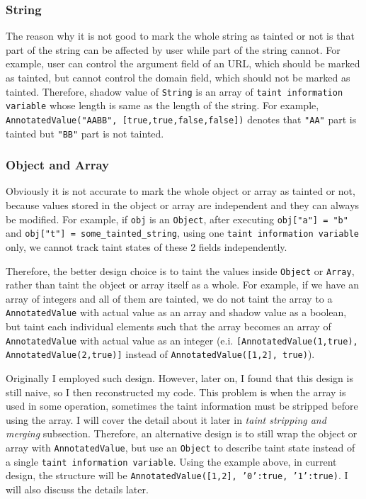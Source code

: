 \subsubsection{String}

The reason why it is not good to mark the whole string as tainted or not is that part of the string can be affected by user while part of the string cannot. For example, user can control the argument field of an URL, which should be marked as tainted, but cannot control the domain field, which should not be marked as tainted. Therefore, shadow value of \texttt{String} is an array of \texttt{taint information variable} whose length is same as the length of the string. For example, \texttt{AnnotatedValue("AABB", [true,true,false,false])} denotes that \texttt{"AA"} part is tainted but \texttt{"BB"} part is not tainted.

\subsubsection{Object and Array}

Obviously it is not accurate to mark the whole object or array as tainted or not, because values stored in the object or array are independent and they can always be modified. For example, if \texttt{obj} is an \texttt{Object}, after executing \texttt{obj["a"] = "b"} and \texttt{obj["t"] = some_tainted_string}, using one \texttt{taint information variable} only, we cannot track taint states of these 2 fields independently. 

Therefore, the better design choice is to taint the values inside \texttt{Object} or \texttt{Array}, rather than taint the object or array itself as a whole. For example, if we have an array of integers and all of them are tainted, we do not taint the array to a \texttt{AnnotatedValue} with actual value as an array and shadow value as a boolean, but taint each individual elements such that the array becomes an array of \texttt{AnnotatedValue} with actual value as an integer (e.i. \texttt{[AnnotatedValue(1,true), AnnotatedValue(2,true)]} instead of \texttt{AnnotatedValue([1,2], true)}). 

Originally I employed such design. However, later on, I found that this design is still naive, so I then reconstructed my code. This problem is when the array is used in some operation, sometimes the taint information must be stripped before using the array. I will cover the detail about it later in \textit{taint stripping and merging} subsection. Therefore, an alternative design is to still wrap the object or array with \texttt{AnnotatedValue}, but use an \texttt{Object} to describe taint state instead of a single \texttt{taint information variable}. Using the example above, in current design, the structure will be \texttt{AnnotatedValue([1,2], {'0':true, '1':true})}. I will also discuss the details later.

